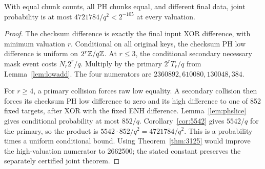\begin{theorem}\label{thm:enhjoint}
With equal chunk counts, all PH chunks equal, and different final data, joint probability is at most $4721784/q^2<2^{-105}$ at every valuation.
\end{theorem}
\begin{proof}
The checksum difference is exactly the final input XOR difference, with minimum valuation $r$. Conditional on all original keys, the checksum PH low difference is uniform on $2^r\mathbb Z/q\mathbb Z$. At $r\le3$, the conditional secondary necessary mask event costs $N_r2^r/q$. Multiply by the primary $2^rT_r/q$ from Lemma~\ref{lem:lowadd}. The four numerators are $2360892,610080,130048,384$.

For $r\ge4$, a primary collision forces raw low equality. A secondary collision then forces its checksum PH low difference to zero and its high difference to one of 852 fixed targets, after XOR with the fixed ENH difference. Lemma~\ref{lem:phslice} gives conditional probability at most $852/q$. Corollary~\ref{cor:5542} gives $5542/q$ for the primary, so the product is $5542\cdot852/q^2=4721784/q^2$. This is a probability times a uniform conditional bound. Using Theorem~\ref{thm:3125} would improve the high-valuation numerator to 2662500; the stated constant preserves the separately certified joint theorem.
\end{proof}

